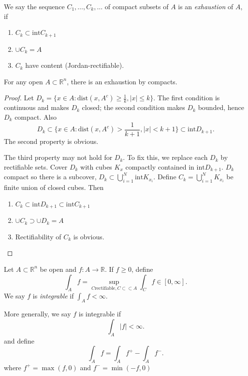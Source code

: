 \begin{definition}
	We say the sequence $C_1, \ldots, C_k, \ldots$ of compact subsets of $A$ is an \textit{exhaustion} of $A$, if
	\begin{enumerate}
		\item $C_k \subset \text{int} C_{k+1}$
		\item $\cup C_k = A$
		\item $C_k$ have content (Jordan-rectifiable).
	\end{enumerate}
\end{definition}
\begin{proposition}
	For any open $A \subset \mathbb{R}^n$, there is an exhaustion by compacts.
\end{proposition}
\begin{proof}
	Let $D_k = \{x \in A: \text{dist}(x, A^c) \ge \frac{1}{k}, |x| \le k\} $. The first condition is continuous and makes $D_k$ closed; the second condition makes $D_k$ bounded, hence $D_k$ compact. Also
	\[
		D_k \subset \{x \in A: \text{dist}(x, A^c) > \frac{1}{k+1}, |x| < k+1\} \subset \text{int}D_{k+1} 
	.\] 
	The second property is obvious.

	The third property may not hold for $D_k$. To fix this, we replace each $D_k$ by rectifiable sets. Cover $D_k$ with cubes $K_x$ compactly contained in $\text{int} D_{k+1}$. $D_k$ compact so there is a subcover, $D_k \subset \bigcup_{i = 1} ^N \text{int} K_{x_i}$. Define $C_k = \bigcup_{i = 1} ^N K_{x_i}$ be finite union of closed cubes. Then 
	\begin{enumerate}
		\item $C_k \subset \text{int}D_{k+1} \subset \text{int}C_{k+1}$
		\item $\cup C_k \supset \cup  D_k = A$ 
		\item Rectifiability of $C_k$ is obvious.
	\end{enumerate}
\end{proof}

\begin{definition}
	Let $A \subset \mathbb{R}^n$ be open and $f: A \to \mathbb{R}$.
	If $f \ge 0$, define
	\[
		\int _A f = \sup_{C \text{rectifiable}, C \subset \subset A} \int _C f \in [0,\infty ]
	.\] 
	We say $f$ is \textit{integrable} if $\int _A f < \infty $.

	More generally, we say $f$ is integrable if
	\[
		\int _A |f| < \infty 
	.\] 
	and define
	\[
		\int _A f = \int _A f^+ - \int _A f^-
	.\] 
where $f^+ = \max(f, 0)$ and $f^- = \min (-f, 0)$

\end{definition}
